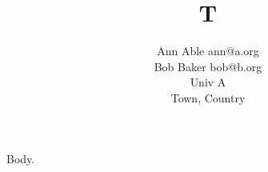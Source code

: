 \documentclass{article}
\begin{document}
\title{T}
\author{Ann Able ann@a.org\\ Bob Baker bob@b.org\\ Univ A\\ Town, Country}
\maketitle
Body.
\end{document}
